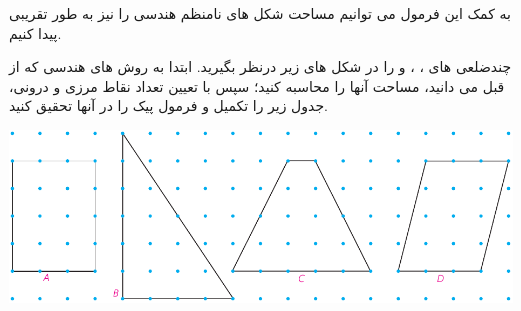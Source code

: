 \documentclass[12pt, a4paper, twoside]{book}
\begin{document}
به کمک این فرمول می توانیم مساحت شکل های نامنظم هندسی را نیز به طور تقریبی پیدا کنیم.

چندضلعی های 
 ،
 ،
 و
را در شکل های زیر درنظر بگیرید. ابتدا به روش های هندسی که از قبل می دانید، مساحت آنها را محاسبه کنید؛ سپس با تعیین تعداد نقاط مرزی و درونی، جدول زیر را تکمیل و فرمول پیک را در آنها تحقیق کنید.
\smallskip

\begin{minipage}{1\textwidth}
	\begin{center}
		\includegraphics{"Shapes/Fasl - 3/Dars 2/P71-S1.pdf"}
	\end{center}
\end{minipage}

\newpage
\end{document}

